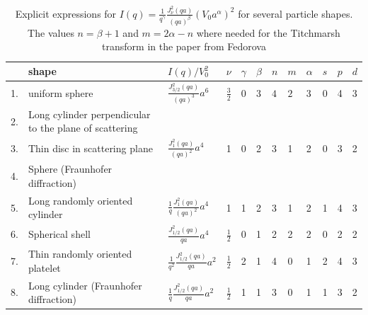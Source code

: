 \begin{table}[htb]
\centering
\caption{Explicit expressions for $\displaystyle I(q)=\frac{1}{q^\gamma}\frac{J_\nu^2(qa)}{(qa)^\beta} \left(V_0a^\alpha\right)^2$ for several particle shapes. The values $n=\beta+1$ and $m=2\alpha-n$ where needed for the Titchmarsh transform in the paper from Fedorova}
\label{tab:gFF}
\begin{tabular}{|lL{5.5cm}|l|l|l|l|l|l|l|l|l|l|}
\toprule
& shape
             & $I(q)/V_0^2$  & $\nu$ & $\gamma$ & $\beta$ & $n$ & $m$     & $\alpha$ & $s$ & $p$ & $d$\\ .& uniform sphere
             & $\displaystyle \frac{J^2_{3/2}(qa)}{(qa)^3} a^6$     & $\frac32$ & 0 & 3 & $4$  & $2$    & 3 & 0 & 4 & 3\\
\parbox{0.3cm}{2.\newline\phantom{2.}}& Long cylinder perpendicular to
the plane of scattering
             &                                                       &            & & & & &          &   &   &   \\
3.& Thin disc in scattering  plane
             & $\displaystyle \frac{J^2_{1}(qa)}{(qa)^2} a^4$        & 1  & 0     & 2 & 3 & 1                      & 2 & 0 & 3 & 2 \\
\parbox{0.3cm}{4.\newline\phantom{4.}}& Sphere (Fraunhofer diffraction)
             &                                                       &            & & & & &           &   &   &  \\
\parbox{0.3cm}{5.\newline\phantom{5.}}  &Long randomly oriented cylinder
             & $\displaystyle \frac1q \frac{J^2_{1}(qa)}{(qa)^2} a^4$     & 1 & 1 & 2 & 3 & 1 & 2 & 1 & 4 & 3\\
6.& Spherical shell
             & $\displaystyle \frac{J^2_{1/2}(qa)}{qa} a^4$          & $\displaystyle\frac12$ & 0 & 1 & 2 & 2 & 2 & 0 & 2 & 2 \\
\parbox{0.3cm}{7.\newline\phantom{7.}}& Thin randomly oriented
platelet
             & $\displaystyle \frac{1}{q^2}\frac{J^2_{1/2}(qa)}{qa} a^2$ & $\displaystyle\frac12$ & 2 & 1 & 4 & 0 & 1 & 2 & 4 & 3 \\
\parbox{0.3cm}{8.\newline\phantom{8.}}& Long cylinder (Fraunhofer diffraction)
             & $\displaystyle \frac1q \frac{J^2_{1/2}(qa)}{qa} a^2$      & $\displaystyle\frac12$ & 1 & 1 & 3 & 0 & 1 & 1 & 3 & 2  \\

\end{tabular}
\end{table}
